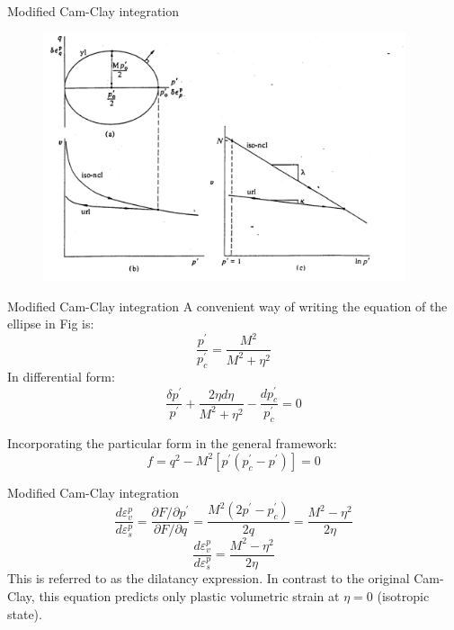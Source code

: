 \documentclass[notes]{beamer}
\begin{document}
\begin{frame}{Modified Cam-Clay integration}
	\begin{figure}
		\includegraphics[width=0.95\textwidth]{figs/mcc-ellipse.png}
	\end{figure}
\end{frame}

\begin{frame}{Modified Cam-Clay integration}
	A convenient way of writing the equation of the ellipse in Fig is:
	\begin{equation*}
	\frac{p^\prime}{p_c^\prime} = \frac{M^2}{M^2 + \eta^2}
	\end{equation*}
	In differential form:
	\begin{equation*}
	\frac{\delta p^\prime}{p^\prime} + \frac{2\eta d\eta}{M^2 + \eta^2} - \frac{dp_c^\prime}{p_c^\prime} = 0
	\end{equation*}

	Incorporating the particular form in the general framework:
	\begin{equation*}
	f = q^2 - M^2 [p^\prime (p_c^\prime - p^\prime)] = 0
	\end{equation*}
\end{frame}


\begin{frame}{Modified Cam-Clay integration}
	\begin{equation*}
		\frac{d\varepsilon_v^p}{d\varepsilon_s^p} = \frac{\partial F / \partial p^\prime}{\partial F / \partial q} = \frac{M^2 (2p^\prime - p_c^\prime)}{2q} = \frac{M^2 - \eta^2}{2\eta}
	\end{equation*}
	\begin{equation*}
	\frac{d\varepsilon_v^p}{d\varepsilon_s^p} = \frac{M^2 - \eta^2}{2 \eta}
	\end{equation*}
	This is referred to as the dilatancy expression. In contrast to the original Cam-Clay, this equation predicts only plastic volumetric strain at $\eta = 0$ (isotropic state).
\end{frame}
\end{document}
